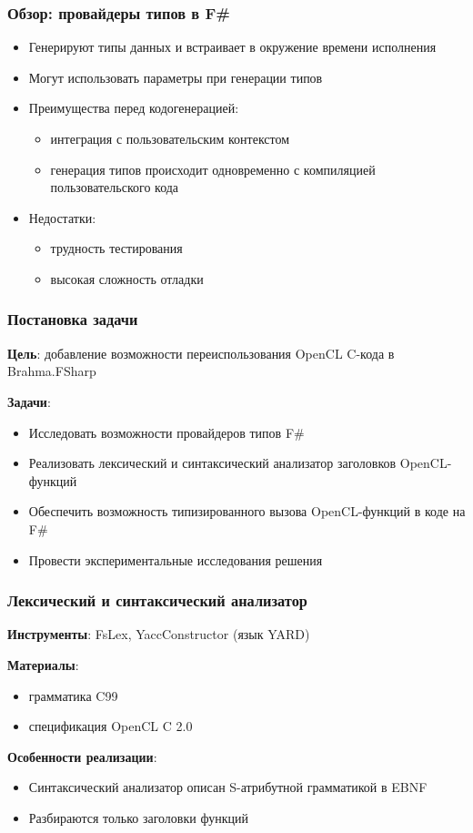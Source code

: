 \documentclass{beamer}
\begin{document}
\begin{frame}
  \transwipe[direction=90]
  \frametitle{Обзор: провайдеры типов в F\#}
  \begin{itemize}
    \item Генерируют типы данных и встраивает в окружение времени исполнения
    \item Могут использовать параметры при генерации типов
  \end{itemize}

  \begin{itemize}
    \item Преимущества перед кодогенерацией:
    \begin{itemize}
        \item интеграция с пользовательским контекстом
        \item генерация типов происходит одновременно с компиляцией пользовательского кода
    \end{itemize}
    \item Недостатки:
    \begin{itemize}
        \item трудность тестирования
        \item высокая сложность отладки
    \end{itemize}
  \end{itemize}
\end{frame}

\begin{frame}
  \transwipe[direction=90]
  \frametitle{Постановка задачи}
  \textbf{Цель}: добавление возможности переиспользования OpenCL C-кода в Brahma.FSharp

  \textbf{Задачи}:
  \begin{itemize}
    \item Исследовать возможности провайдеров типов F\#
    \item Реализовать лексический и синтаксический анализатор заголовков OpenCL-функций
    \item Обеспечить возможность типизированного вызова OpenCL-функций в коде на F\#
    \item Провести экспериментальные исследования решения
  \end{itemize}
\end{frame}

\begin{frame}
  \transwipe[direction=90]
  \frametitle{Лексический и синтаксический анализатор}
  \textbf{Инструменты}: FsLex, YaccConstructor (язык YARD)

  \textbf{Материалы}:
  \begin{itemize}
  \item грамматика C99
  \item спецификация OpenCL C 2.0
  \end{itemize}

  \textbf{Особенности реализации}:
  \begin{itemize}
    \item Синтаксический анализатор описан S-атрибутной грамматикой в EBNF
    \item Разбираются только заголовки функций
  \end{itemize}
\end{frame}
\end{document}
